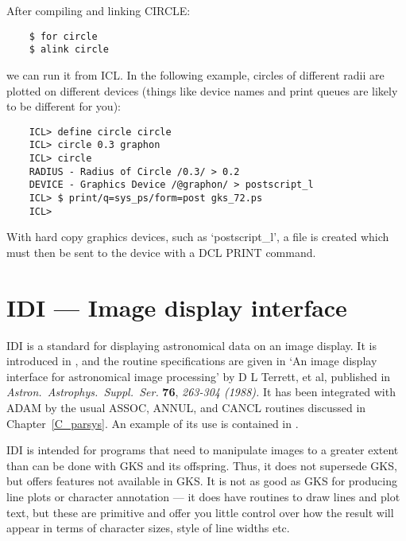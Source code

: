 After compiling and linking CIRCLE:

\begin{small}
\begin{verbatim}
    $ for circle
    $ alink circle
\end{verbatim}
\end{small}

we can run it from ICL.
In the following example, circles of different radii are plotted on different
devices (things like device names and print queues are likely to be different
for you):

\begin{small}
\begin{verbatim}
    ICL> define circle circle
    ICL> circle 0.3 graphon
    ICL> circle
    RADIUS - Radius of Circle /0.3/ > 0.2
    DEVICE - Graphics Device /@graphon/ > postscript_l
    ICL> $ print/q=sys_ps/form=post gks_72.ps
    ICL>                               
\end{verbatim}
\end{small}

With hard copy graphics devices, such as `postscript\_l', a file is created
which must then be sent to the device with a DCL PRINT command.

\section{IDI --- Image display interface}

IDI is a standard for displaying astronomical data on an image display.
It is introduced in , and the routine specifications are
given in
`An image display interface for astronomical image processing' by D L Terrett,
et al, published in {\em Astron.\ Astrophys.\ Suppl.\ Ser.} {\bf 76},
{\em 263-304 (1988).}
It has been integrated with ADAM by the usual ASSOC, ANNUL, and CANCL routines
discussed in Chapter~\ref{C_parsys}.
An example of its use is contained in .

IDI is intended for programs that need to manipulate images to a greater extent
than can be done with GKS and its offspring.
Thus, it does not supersede GKS, but offers features not available in GKS.
It is not as good as GKS for producing line plots or character annotation ---
it does have routines to draw lines and plot text, but these are primitive and
offer you little control over how the result will appear in terms of character
sizes, style of line widths etc.

